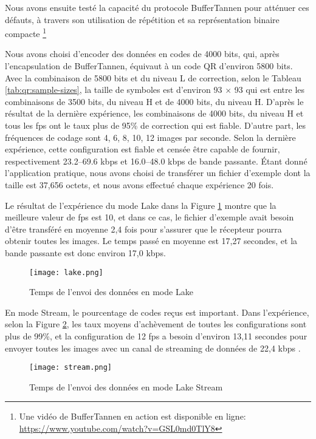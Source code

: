 Nous avons ensuite testé la capacité du protocole BufferTannen pour atténuer ces défauts, à travers son utilisation de répétition et sa représentation binaire compacte \footnote{Une vidéo de BufferTannen en action est disponible en ligne: \url{https://www.youtube.com/watch?v=GSL0md0TlY8}}

Nous avons choisi d'encoder des données en codes de 4000 bits, qui, après l'encapsulation de BufferTannen, équivaut à un code QR d'environ 5800 bits. Avec la combinaison de 5800 bits et du niveau L de correction, selon le Tableau \ref{tab:qr:sample-sizes}, la taille de symboles est d'environ 93 $\times$ 93 qui est entre les combinaisons de 3500 bits, du niveau H et de 4000 bits, du niveau H. D'après le résultat de la dernière expérience, les combinaisons de 4000 bits, du niveau H et tous les fps ont le taux plus de 95\% de correction   qui est fiable. D'autre part, les fréquences de codage sont 4, 6, 8, 10, 12 images par seconde. Selon la dernière expérience, cette configuration est fiable et censée être capable de fournir, respectivement 23.2--69.6 kbps et 16.0--48.0 kbps de bande passante. Étant donné l'application pratique, nous avons choisi de transférer un fichier d'exemple dont la taille est 37,656 octets, et nous avons effectué chaque expérience 20 fois.

Le résultat de l'expérience du mode Lake dans la Figure \ref{img-explake} montre que la meilleure valeur de fps est 10, et dans ce cas, le fichier d'exemple avait besoin d'être transféré en moyenne 2,4 fois pour s'assurer que le récepteur pourra obtenir toutes les images. Le temps passé en moyenne est 17,27 secondes, et la bande passante est donc environ 17,0 kbps.

\begin{figure}[ht]
\begin{center}
\centering
\texttt{[image: lake.png]}
\caption{Temps de l'envoi des données en mode Lake}
\label{img-explake}
\end{center}
\end{figure}

En mode Stream, le pourcentage de codes reçus est important. Dans l'expérience, selon la Figure \ref{img-expstream}, les taux moyens d'achèvement de toutes les configurations sont plus de 99\%, et la configuration de 12 fps a besoin d'environ 13,11 secondes pour envoyer toutes les images avec un canal de streaming de données de 22,4 kbps .

\begin{figure}[ht]
\begin{center}
\centering
\texttt{[image: stream.png]}
\caption{Temps de l'envoi des données en mode Lake Stream}
\label{img-expstream}
\end{center}
\end{figure}

